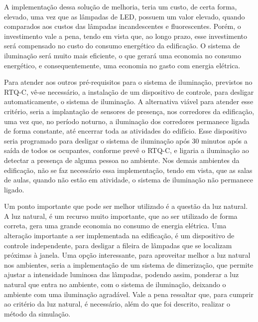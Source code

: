 A implementação dessa solução de melhoria, teria um custo, de certa forma, elevado, uma vez que as lâmpadas de LED, possuem um valor elevado, quando comparados aos custos das lâmpadas incandescentes e fluorescentes. Porém, o investimento vale a pena, tendo em vista que, ao longo prazo, esse investimento será compensado no custo do consumo energético da edificação. O sistema de iluminação será muito mais eficiente, o que gerará uma economia no consumo energético, e consequentemente, uma economia no gasto com energia elétrica.

Para atender aos outros pré-requisitos para o sistema de iluminação, previstos no RTQ-C, vê-se necessário, a instalação de um dispositivo de controle, para desligar automaticamente, o sistema de iluminação. A alternativa viável para atender esse critério, seria a implantação de sensores de presença, nos corredores da edificação, uma vez que, no período noturno, a iluminação dos corredores permanece ligada de forma constante, até encerrar toda as atividades do edifício. Esse dispositivo seria programado para desligar o sistema de iluminação após 30 minutos após a saída de todos os ocupantes, conforme prevê o RTQ-C, e ligaria a iluminação ao detectar a presença de alguma pessoa no ambiente. Nos demais ambientes da edificação, não se faz necessário essa implementação, tendo em vista, que as salas de aulas, quando não estão em atividade, o sistema de iluminação não permanece ligado.

Um ponto importante que pode ser melhor utilizado é a questão da luz natural. A luz natural, é um recurso muito importante, que ao ser utilizado de forma correta, gera uma grande economia no consumo de energia elétrica. Uma alteração importante a ser implementada na edificação, é um dispositivo de controle independente, para desligar a fileira de lâmpadas que se localizam próximas à janela. Uma opção interessante, para aproveitar melhor a luz natural nos ambientes, seria a implementação de um sistema de dimerização, que permite ajustar a intensidade luminosa das lâmpadas, podendo assim, ponderar a luz natural que entra no ambiente, com o sistema de iluminação, deixando o ambiente com uma iluminação agradável. Vale a pena ressaltar que, para cumprir ao critério da luz natural, é necessário, além do que foi descrito, realizar o método da simulação.

